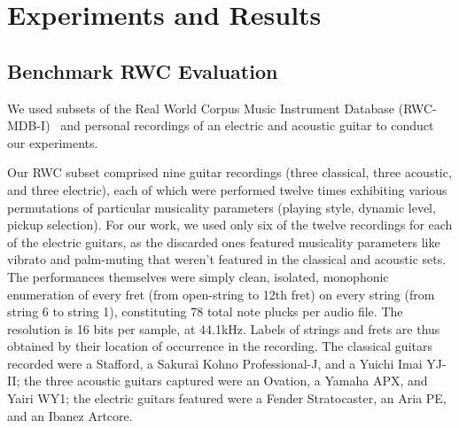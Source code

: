 \documentclass[12pt]{cmuthesis}
\begin{document}
\noindent
\chapter{Experiments and Results}
\label{chap:experiments}
\section{Benchmark RWC Evaluation}

We used subsets of the Real World Corpus Music Instrument Database (RWC-MDB-I)~\cite{goto2003} and personal recordings of an electric and acoustic guitar to conduct our experiments. 

Our RWC subset comprised nine guitar recordings (three classical, three acoustic, and three electric), each of which were performed twelve times exhibiting various permutations of particular musicality parameters (playing style, dynamic level, pickup selection). For our work, we used only six of the twelve recordings for each of the electric guitars, as the discarded ones featured musicality parameters like vibrato and palm-muting that weren't featured in the classical and acoustic sets. The performances themselves were simply clean, isolated, monophonic enumeration of every fret (from open-string to 12th fret) on every string (from string 6 to string 1), constituting 78 total note plucks per audio file. The resolution is 16 bits per sample, at 44.1kHz. Labels of strings and frets are thus obtained by their location of occurrence in the recording. The classical guitars recorded were a Stafford, a Sakurai Kohno Professional-J, and a Yuichi Imai YJ-II; the three acoustic guitars captured were an Ovation, a Yamaha APX, and Yairi WY1; the electric guitars featured were a Fender Stratocaster, an Aria PE, and an Ibanez Artcore.

\end{document}
